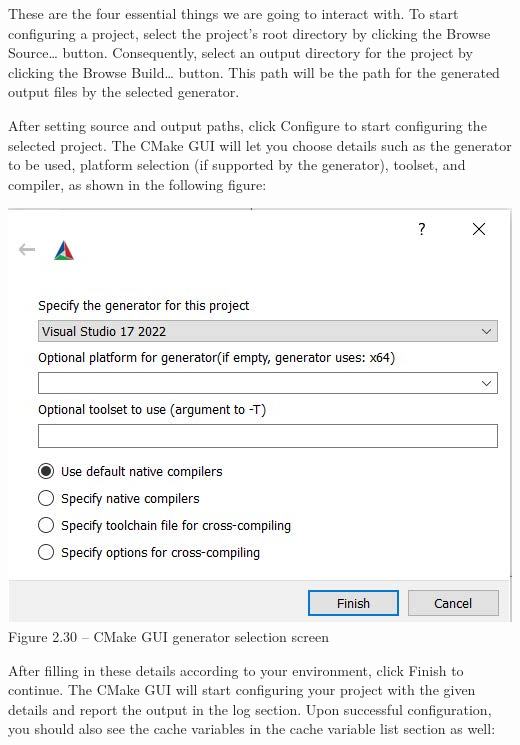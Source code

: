 These are the four essential things we are going to interact with. To start configuring a project, select the project's root directory by clicking the Browse Source… button. Consequently, select an output directory for the project by clicking the Browse Build… button. This path will be the path for the generated output files by the selected generator.

After setting source and output paths, click Configure to start configuring the selected project. The CMake GUI will let you choose details such as the generator to be used, platform selection (if supported by the generator), toolset, and compiler, as shown in the following figure:

\begin{center}
\includegraphics[width=1.\textwidth]{content/1/chapter2/images/30.jpg}\\
Figure 2.30 – CMake GUI generator selection screen
\end{center}

After filling in these details according to your environment, click Finish to continue. The CMake GUI will start configuring your project with the given details and report the output in the log section. Upon successful configuration, you should also see the cache variables in the cache variable list section as well:

